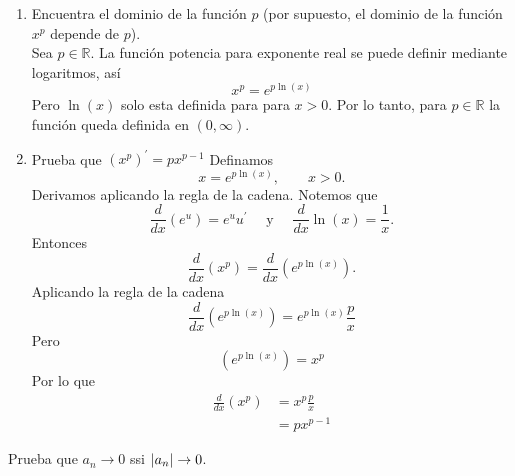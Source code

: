 \documentclass[12pt,a4paper]{article}
\begin{document}
    \begin{solucion}
        \begin{enumerate}
            \item[(a)] Encuentra el dominio de la función $p$ (por supuesto, el dominio de la
            función $x^{p}$ depende de $p$).\\
            Sea $p\in\mathbb{R}$. La función potencia para exponente real se
            puede definir mediante logaritmos, así
            \begin{equation*}
                x^{p}=e^{p\ln(x)}
            \end{equation*}
            Pero $\ln(x)$ solo esta definida para para $x\gt0$. Por lo tanto,
            para $p\in\mathbb{R}$ la función queda definida en $(0,\infty)$.
            \item[(b)] Prueba que $(x^{p})^{\prime}=px^{p-1}$
            Definamos
            \begin{equation*}
                x=e^{p\ln(x)},\qquad x\gt0.
            \end{equation*}
            Derivamos aplicando la regla de la cadena. Notemos que
            \begin{equation*}
                \frac{d}{dx}(e^{u})=e^{u}u^{\prime}\quad\text{ y }\quad \frac{d}{dx}\ln(x)=\frac{1}{x}.
            \end{equation*}
            Entonces
            \begin{equation*}
                \frac{d}{dx}(x^{p})=\frac{d}{dx}(e^{p\ln(x)}).
            \end{equation*}
            Aplicando la regla de la cadena
            \begin{equation*}
                \frac{d}{dx}(e^{p\ln(x)})=e^{p\ln(x)}\frac{p}{x}
            \end{equation*}
            Pero
            \begin{equation*}
                (e^{p\ln(x)})=x^{p}
            \end{equation*}
            Por lo que
            \begin{align*}
                \frac{d}{dx}(x^{p})&=x^{p}\frac{p}{x}\\ 
                &=px^{p-1}
            \end{align*}
        \end{enumerate}
    \end{solucion}

    \begin{mdframed}[style=mdbluebox,frametitle={Ejercicio 8}]
        Prueba que $a_{n}\to0$ ssi $\abs{a_{n}}\to0$.
    \end{mdframed}
\end{document}
